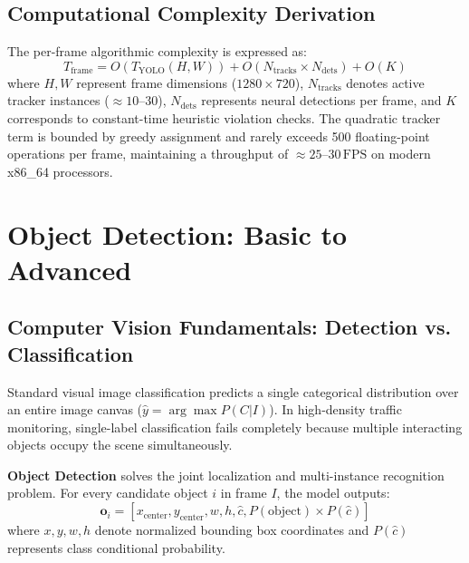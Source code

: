 \documentclass[11pt,a4paper,oneside]{report}
\begin{document}
\section{Computational Complexity Derivation}
The per-frame algorithmic complexity is expressed as:
\begin{equation}
T_{\text{frame}} = O\left(T_{\text{YOLO}}(H, W)\right) + O\left(N_{\text{tracks}} \times N_{\text{dets}}\right) + O(K)
\end{equation}
where $H, W$ represent frame dimensions ($1280 \times 720$), $N_{\text{tracks}}$ denotes active tracker instances ($\approx 10\text{--}30$), $N_{\text{dets}}$ represents neural detections per frame, and $K$ corresponds to constant-time heuristic violation checks. The quadratic tracker term is bounded by greedy assignment and rarely exceeds 500 floating-point operations per frame, maintaining a throughput of $\approx 25\text{--}30\,\text{FPS}$ on modern x86\_64 processors.



\chapter{Object Detection: Basic to Advanced}

\section{Computer Vision Fundamentals: Detection vs. Classification}
Standard visual image classification predicts a single categorical distribution over an entire image canvas ($\hat{y} = \arg\max P(C|I)$). In high-density traffic monitoring, single-label classification fails completely because multiple interacting objects occupy the scene simultaneously.

\textbf{Object Detection} solves the joint localization and multi-instance recognition problem. For every candidate object $i$ in frame $I$, the model outputs:
\begin{equation}
\mathbf{o}_i = \left[ x_{\text{center}}, y_{\text{center}}, w, h, \hat{c}, P(\text{object}) \times P(\hat{c}) \right]
\end{equation}
where $x, y, w, h$ denote normalized bounding box coordinates and $P(\hat{c})$ represents class conditional probability.
\end{document}
